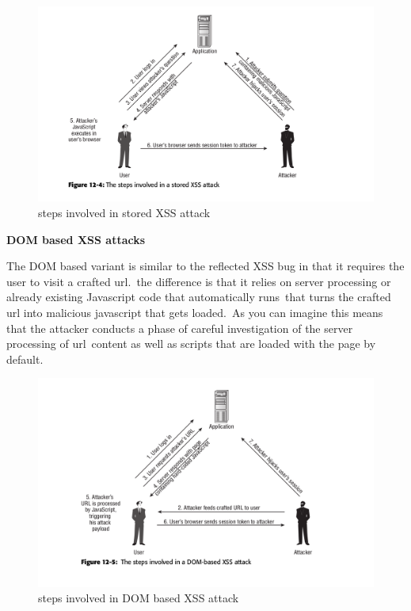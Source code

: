 \begin{figure}
\centering
\includegraphics[width=1\textwidth]{stored-XSS.png}
\caption{\label{fig:xsssto}steps involved in stored XSS attack}
\end{figure}

\textbf{DOM based XSS attacks}

The DOM based variant is similar to the reflected XSS bug in that it requires the user to visit a crafted url.\
the difference is that it relies on server processing or already existing Javascript code that automatically runs\
that turns the crafted url into malicious javascript that gets loaded.\
As you can imagine this means that the attacker conducts a phase of careful investigation of the server processing of url\
content as well as scripts that are loaded with the page by default.\\

\begin{figure}
\centering
\includegraphics[width=1\textwidth]{DOM-XSS.png}
\caption{\label{fig:xssdom}steps involved in DOM based XSS attack}
\end{figure}

